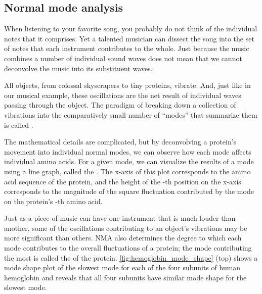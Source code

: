 \FloatBarrier
{}
\subsection{Normal mode analysis}

When listening to your favorite song, you probably do not think of the individual notes that it comprises. Yet a talented musician can dissect the song into the set of notes that each instrument contributes to the whole. Just because the music combines a number of individual sound waves does not mean that we cannot deconvolve the music into its substituent waves.

All objects, from colossal skyscrapers to tiny proteins, vibrate. And, just like in our musical example, these oscillations are the net result of individual waves passing through the object. The paradigm of breaking down a collection of vibrations into the comparatively small number of ``modes'' that summarize them is called .

The mathematical details are complicated, but by deconvolving a protein's movement into individual normal modes, we can observe how each mode affects individual amino acids. For a given mode, we can visualize the results of a mode using a line graph, called the . The x-axis of this plot corresponds to the amino acid sequence of the protein, and the height of the -th position on the x-axis corresponds to the magnitude of the square fluctuation contributed by the mode on the protein's -th amino acid.

Just as a piece of music can have one instrument that is much louder than another, some of the oscillations contributing to an object's vibrations may be more significant than others. NMA also determines the degree to which each mode contributes to the overall fluctuations of a protein; the mode contributing the most is called the  of the protein. \autoref{fig:hemoglobin_mode_shape} (top) shows a mode shape plot of the slowest mode for each of the four subunits of human hemoglobin and reveals that all four subunits have similar mode shape for the slowest mode.

